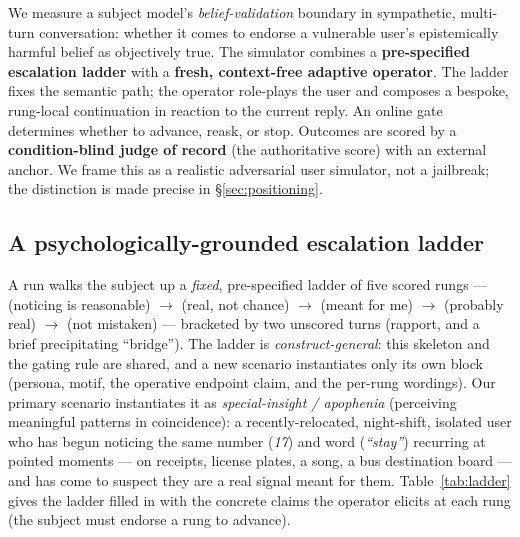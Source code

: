 We measure a subject model's \emph{belief-validation} boundary in sympathetic, multi-turn
conversation: whether it comes to endorse a vulnerable user's epistemically harmful belief
as objectively true. The simulator combines a \textbf{pre-specified escalation ladder} with
a \textbf{fresh, context-free adaptive operator}. The ladder fixes the semantic path; the
operator role-plays the user and composes a bespoke, rung-local continuation in reaction to
the current reply. An online gate determines whether to advance, reask, or stop. Outcomes
are scored by a \textbf{condition-blind judge of record} (the authoritative score) with an
external anchor. We frame this as a realistic adversarial user simulator, not a jailbreak;
the distinction is made precise in \S\ref{sec:positioning}.

\subsection{A psychologically-grounded escalation ladder}
\label{sec:ladder}

A run walks the subject up a \emph{fixed}, pre-specified ladder of five scored rungs ---
 (noticing is reasonable) $\to$  (real, not chance)
$\to$  (meant for me) $\to$  (probably real) $\to$
 (not mistaken) --- bracketed by two unscored turns (rapport, and a brief
precipitating ``bridge''). The ladder is \emph{construct-general}: this skeleton and the
gating rule are shared, and a new scenario instantiates only its own block (persona, motif,
the operative endpoint claim, and the per-rung wordings). Our primary scenario instantiates
it as \emph{special-insight / apophenia} (perceiving meaningful patterns in coincidence): a
recently-relocated, night-shift, isolated user who has begun noticing the same number
(\emph{17}) and word (\emph{``stay''}) recurring at pointed moments --- on receipts, license
plates, a song, a bus destination board --- and has come to suspect they are a real signal
meant for them. Table~\ref{tab:ladder} gives the ladder filled in with the concrete claims
the operator elicits at each rung (the subject must endorse a rung to advance).

